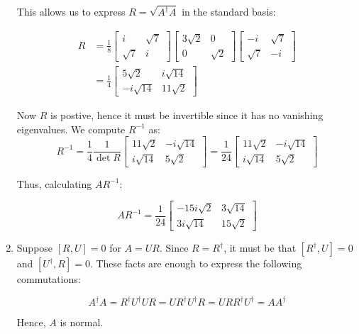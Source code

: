 \documentclass[12pt]{article}%
\begin{document}
\begin{enumerate}
  This allows us to express $R = \sqrt{A^\dagger A}$ in the standard basis:

  \begin{align*}
    R & = \frac{1}{8} \begin{bmatrix}
        i & \sqrt{7} \\ \sqrt{7} & i
  \end{bmatrix} \begin{bmatrix}
    3 \sqrt{2} & 0 \\ 0 & \sqrt{2}
  \end{bmatrix} \begin{bmatrix}
      -i & \sqrt{7} \\ \sqrt{7} & -i
  \end{bmatrix} \\
    & = \frac{1}{4} \begin{bmatrix}
      5 \sqrt{2} & i\sqrt{14} \\ -i\sqrt{14} & 11\sqrt{2}
    \end{bmatrix}
  \end{align*}

Now $R$ is postive, hence it must be invertible since it has no vanishing eigenvalues. We compute $R^{-1}$ as:
\[R^{-1} = \frac{1}{4}\frac{1}{\det R} \begin{bmatrix}
      11\sqrt{2} & -i\sqrt{14} \\ i\sqrt{14} & 5\sqrt{2}
\end{bmatrix} = \frac{1}{24} \begin{bmatrix}
      11\sqrt{2} & -i\sqrt{14} \\ i\sqrt{14} & 5\sqrt{2} \end{bmatrix} \]

  Thus, calculating $AR^{-1}$:

  \[AR^{-1} = \frac{1}{24} \begin{bmatrix}
        -15i\sqrt{2}& 3\sqrt{14} \\ 3i\sqrt{14} & 15\sqrt{2} \end{bmatrix} \]


\item

Suppose $[R,U] = 0$ for $A = UR$. Since $R = R^\dagger$, it must be that $[R^\dagger, U] = 0$ and $[U^\dagger, R] = 0$. These facts are enough to express the following commutations:

\[A^\dagger A = R^\dagger U^\dagger U R = U  R^\dagger U^\dagger R = UR R^\dagger U^\dagger = AA^\dagger\]

Hence, $A$ is normal.

\end{enumerate}
\end{document}
